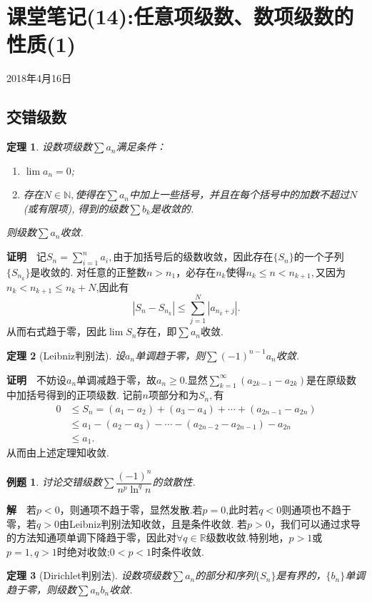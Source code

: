 \documentclass[UTF8]{article}
\newcommand{\zm}{\textbf{证明}$\quad$}
\newcommand{\jie}{\textbf{解}$\quad$}
\newtheorem{thm}{\hspace{2em}定理}[section]
\newtheorem{exa}{\hspace{2em}例题}[section]
\begin{document}
\section{课堂笔记(14):任意项级数、数项级数的性质(1)}
\begin{center}
  2018年4月16日
\end{center}
\subsection{交错级数}
\begin{thm}
  设数项级数$\sum a_n$满足条件：
  \begin{enumerate}
    \item $\lim a_n=0$;
    \item 存在$N\in\mathbb{N},$使得在$\sum a_n$中加上一些括号，并且在每个括号中的加数不超过$N$(或有限项),
    得到的级数$\sum b_k$是收敛的.
  \end{enumerate}
  则级数$\sum a_n$收敛.
\end{thm}
\zm 记$S_n=\sum\limits_{i=1}^na_i,$由于加括号后的级数收敛，因此存在$\{S_n\}$的一个子列$\{S_{n_k}\}$是收敛的.
对任意的正整数$n>n_1$，必存在$n_k$使得$n_k\le n<n_{k+1},$又因为$n_k<n_{k+1}\le n_k+N$,因此有
$$|S_n-S_{n_k}|\le\sum_{j=1}^N|a_{n_k+j}|.$$从而右式趋于零，因此$\lim S_n$存在，即$\sum a_n$收敛.
\begin{thm}[Leibniz判别法]
  设$a_n$单调趋于零，则$\sum (-1)^{n-1}a_n$收敛.
\end{thm}
\zm 不妨设$a_n$单调减趋于零，故$a_n\ge 0.$显然$\sum_{k=1}^\infty(a_{2k-1}-a_{2k})$是在原级数中加括号得到的正项级数.
记前$n$项部分和为$S_n,$有
\begin{align*}
  0&\le S_n=(a_1-a_2)+(a_3-a_4)+\cdots+(a_{2n-1}-a_{2n})\\
  &\le a_1-(a_2-a_3)-\cdots-(a_{2n-2}-a_{2n-1})-a_{2n}\\
  &\le a_1.
\end{align*}
从而由上述定理知收敛.
\begin{exa}
  讨论交错级数$\sum\dfrac{(-1)^n}{n^p\ln^qn}$的敛散性.
\end{exa}
\jie 若$p<0$，则通项不趋于零，显然发散.若$p=0$,此时若$q<0$则通项也不趋于零，若$q>0$由Leibniz判别法知收敛，且是条件收敛.
若$p>0$，我们可以通过求导的方法知通项单调下降趋于零，因此对$\forall q\in\mathbb{R}$级数收敛.特别地，$p>1$或
$p=1,q>1$时绝对收敛;$0<p<1$时条件收敛.
\begin{thm}[Dirichlet判别法]
  设数项级数$\sum a_n$的部分和序列$\{S_n\}$是有界的，$\{b_n\}$单调趋于零，则级数$\sum a_nb_n$收敛.
\end{thm}
\end{document}
